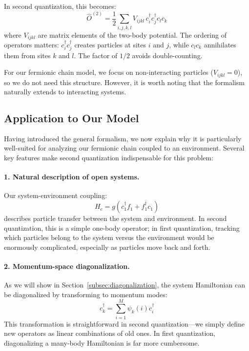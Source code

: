 \documentclass[12pt,oneside,openright]{report}
\theoremstyle{definition}
\theoremstyle{plain}
\theoremstyle{remark}
\begin{document}
In second quantization, this becomes:
\begin{equation}
\hat{O}^{(2)} = \frac{1}{2} \sum_{i,j,k,l} V_{ijkl} \, c_i^\dagger c_j^\dagger c_l c_k
\label{eq:two_body_op_general}
\end{equation}
where $V_{ijkl}$ are matrix elements of the two-body potential. The ordering of operators 
matters: $c_i^\dagger c_j^\dagger$ creates particles at sites $i$ and $j$, while $c_l c_k$ 
annihilates them from sites $k$ and $l$. The factor of $1/2$ avoids double-counting.

For our fermionic chain model, we focus on non-interacting particles ($V_{ijkl} = 0$), so 
we do not need this structure. However, it is worth noting that the formalism naturally 
extends to interacting systems.

\subsection{Application to Our Model}
\label{subsec:why_for_our_model}
Having introduced the general formalism, we now explain why it is particularly well-suited 
for analyzing our fermionic chain coupled to an environment. Several key features make second 
quantization indispensable for this problem:

\paragraph{1. Natural description of open systems.}
Our system-environment coupling:
\begin{equation}
H_c = g(c_1^\dagger f_1 + f_1^\dagger c_1)
\end{equation}
describes particle transfer between the system and environment. In second quantization, this 
is a simple one-body operator; in first quantization, tracking which particles belong to the 
system versus the environment would be enormously complicated, especially as particles move 
back and forth.

\paragraph{2. Momentum-space diagonalization.}
As we will show in Section~\ref{subsec:diagonalization}, the system Hamiltonian can be diagonalized 
by transforming to momentum modes:
\begin{equation}
c_k^\dagger = \sum_{i=1}^M \psi_k(i) c_i^\dagger
\end{equation}
This transformation is straightforward in second quantization—we simply define new operators 
as linear combinations of old ones. In first quantization, diagonalizing a many-body Hamiltonian 
is far more cumbersome.
\end{document}
